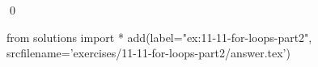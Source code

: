 
\begin{ex}
  \label{ex:11-11-for-loops-part2}
  
  \qed
\end{ex}
\begin{python0}
from solutions import *
add(label="ex:11-11-for-loops-part2",
    srcfilename='exercises/11-11-for-loops-part2/answer.tex')
\end{python0}
